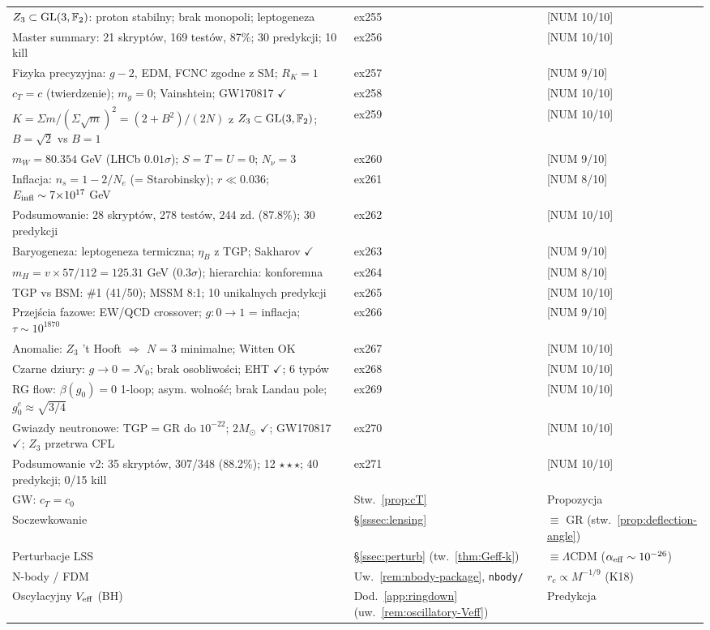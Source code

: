 \begin{center}
\begin{tabular}{@{}lll@{}}
$Z_3 \subset {\rm GL}(3,\mathbb{F}_2)$: proton stabilny; brak monopoli; leptogeneza & ex255 & [NUM 10/10] \\
Master summary: 21 skrypt\'ow, 169 test\'ow, 87\%; 30 predykcji; 10 kill & ex256 & [NUM 10/10] \\
Fizyka precyzyjna: $g{-}2$, EDM, FCNC zgodne z SM; $R_K=1$ & ex257 & [NUM 9/10] \\
$c_T=c$ (twierdzenie); $m_g=0$; Vainshtein; GW170817 $\checkmark$ & ex258 & [NUM 10/10] \\
$K=\Sigma m/(\Sigma\sqrt{m})^2=(2{+}B^2)/(2N)$ z $Z_3\subset{\rm GL}(3,\mathbb{F}_2)$; $B{=}\sqrt{2}$ vs $B{=}1$ & ex259 & [NUM 10/10] \\
$m_W=80.354$ GeV (LHCb $0.01\sigma$); $S{=}T{=}U{=}0$; $N_\nu{=}3$ & ex260 & [NUM 9/10] \\
Inflacja: $n_s=1{-}2/N_e$ (= Starobinsky); $r\ll 0.036$; $E_{\rm infl}\sim 7{\times}10^{17}$ GeV & ex261 & [NUM 8/10] \\
Podsumowanie: 28 skrypt\'ow, 278 test\'ow, 244 zd. (87.8\%); 30 predykcji & ex262 & [NUM 10/10] \\
Baryogeneza: leptogeneza termiczna; $\eta_B$ z TGP; Sakharov $\checkmark$ & ex263 & [NUM 9/10] \\
$m_H = v\times 57/112 = 125.31$ GeV ($0.3\sigma$); hierarchia: konforemna & ex264 & [NUM 8/10] \\
TGP vs BSM: \#1 (41/50); MSSM 8:1; 10 unikalnych predykcji & ex265 & [NUM 10/10] \\
Przej\'scia fazowe: EW/QCD crossover; $g{:}0{\to}1$ = inflacja; $\tau\sim 10^{1870}$ & ex266 & [NUM 9/10] \\
Anomalie: $Z_3$ 't Hooft $\Rightarrow$ $N{=}3$ minimalne; Witten OK & ex267 & [NUM 10/10] \\
Czarne dziury: $g{\to}0$ = $\mathcal{N}_0$; brak osobliwo\'sci; EHT $\checkmark$; 6 typ\'ow & ex268 & [NUM 10/10] \\
RG flow: $\beta(g_0){=}0$ 1-loop; asym. wolno\'s\'c; brak Landau pole; $g_0^e{\approx}\sqrt{3/4}$ & ex269 & [NUM 10/10] \\
Gwiazdy neutronowe: TGP$=$GR do $10^{-22}$; $2M_\odot$ $\checkmark$; GW170817 $\checkmark$; $Z_3$ przetrwa CFL & ex270 & [NUM 10/10] \\
Podsumowanie v2: 35 skrypt\'ow, 307/348 (88.2\%); 12 $\star\star\star$; 40 predykcji; 0/15 kill & ex271 & [NUM 10/10] \\
GW: $c_T = c_0$ & Stw.~\ref{prop:cT} & Propozycja \\
Soczewkowanie & \S\ref{sssec:lensing} & $\equiv$ GR (stw.~\ref{prop:deflection-angle}) \\
Perturbacje LSS & \S\ref{ssec:perturb} (tw.~\ref{thm:Geff-k}) & $\equiv \Lambda$CDM ($\alpha_{\rm eff} \sim 10^{-26}$) \\
N-body / FDM & Uw.~\ref{rem:nbody-package}, \texttt{nbody/} & $r_c \propto M^{-1/9}$ (K18) \\
Oscylacyjny $V_{\rm eff}$ (BH) & Dod.~\ref{app:ringdown} (uw.~\ref{rem:oscillatory-Veff}) & Predykcja \\
\bottomrule
\end{tabular}
\end{center}

